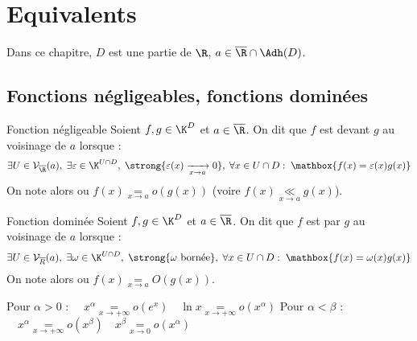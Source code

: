 \documentclass[12pt,a4paper]{report}
\begin{document}
\chapter{Equivalents}

Dans ce chapitre, $D$ est une partie de $\R$, $a \in \overline{\R} \cap \Adh(D)$.

\section{Fonctions négligeables, fonctions dominées}

\begin{definition}{Fonction négligeable}{}
    Soient $f, g \in \K^D$ et $a \in \overline{\R}$. On dit que $f$ est  devant $g$ au voisinage de $a$ lorsque :
    $$
    \exists U \in \mathcal{V}_{\overline{\R}}(a), \;
    \exists \varepsilon \in \K^{U \cap D}, \;
    \strong{\varepsilon(x) \xrightarrow[x \to a]{} 0}, \;
    \forall x \in U \cap D : \;
    \mathbox{f(x) = \varepsilon(x)g(x)}
    $$
    On note alors  ou $f(x) \underset{x \to a}{=} o(g(x))$ (voire $f(x) \underset{x \to a}{\ll} g(x)$\footnotemark).
\end{definition}


\begin{definition}{Fonction dominée\footnotemark}{}
    Soient $f, g \in \K^{D}$ et $a \in \overline{\R}$. On dit que $f$ est  par $g$ au voisinage de $a$ lorsque :
    $$
    \exists U \in \mathcal{V}_{\overline{R}}(a), \;
    \exists \omega \in \K^{U \cap D}, \;
    \strong{\omega \text{ bornée}}, \;
    \forall x \in U \cap D : \;
    \mathbox{f(x) = \omega(x) g(x)}
    $$
    On note alors  ou $f(x) \underset{x \to a}{=} O(g(x))$.
\end{definition}


\begin{exemple}
Pour $\alpha > 0$ :
$
\quad
x^\alpha \underset{x \to +\infty}{=} o\left(e^x\right)
\quad
\ln x \underset{x \to +\infty}{=} o\left(x^\alpha\right)
$
\hfill
Pour $\alpha < \beta$ :
$
\quad
x^\alpha \underset{x \to +\infty}{=} o\left(x^\beta\right)
\quad
x^\beta \underset{x \to 0}{=} o\left(x^\alpha\right)
$
\end{exemple}

\end{document}

